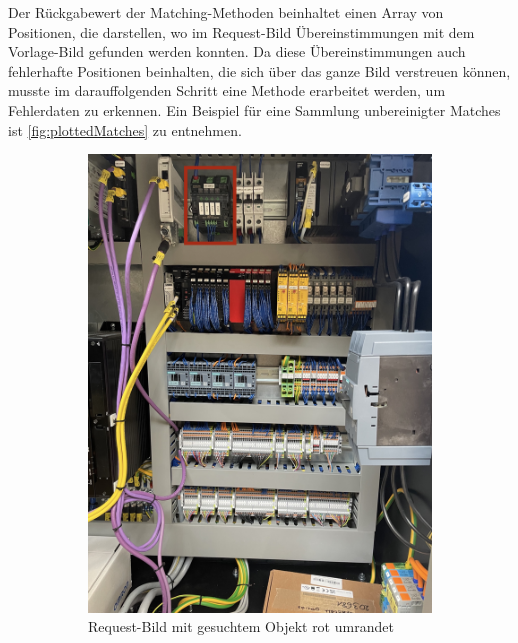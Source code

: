 \documentclass[
    type=Prakikumsbericht,
    status=draft, %
    language=german, %
    bibengine=bibtex,
]{unibwm-inf-thesis}
\begin{document}
    Der Rückgabewert der Matching-Methoden beinhaltet einen Array von Positionen, die darstellen, wo im Request-Bild Übereinstimmungen mit dem Vorlage-Bild gefunden werden konnten.
    Da diese Übereinstimmungen auch fehlerhafte Positionen beinhalten, die sich über das ganze Bild verstreuen können, musste im darauffolgenden Schritt eine Methode erarbeitet werden, um Fehlerdaten zu erkennen.
    Ein Beispiel für eine Sammlung unbereinigter Matches ist \autoref{fig:plottedMatches} zu entnehmen.
    \begin{figure}[b]
        \centering
        \begin{subfigure}{.5\textwidth}
            \centering
            \includegraphics[width=1.0\textwidth]{images/Request_image}
            \caption{Request-Bild mit gesuchtem Objekt rot umrandet}
            \label{fig:sub1}
        \end{subfigure}%
        \begin{subfigure}{0.5\textwidth}
            \centering

\end{subfigure}
\end{figure}
\end{document}

